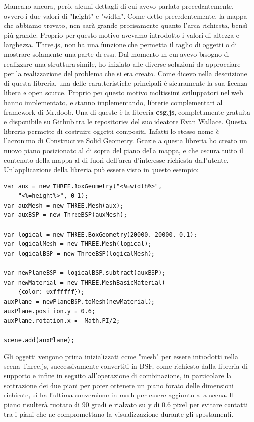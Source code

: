 Mancano ancora, però, alcuni dettagli di cui avevo parlato precedentemente, ovvero i due valori di "height" e "width". Come detto precedentemente, la mappa che abbiamo trovato, non sarà grande precisamente quanto l'area richiesta, bensì più grande. Proprio per questo motivo avevamo introdotto i valori di altezza e larghezza. Three.js, non ha una funzione che permetta il taglio di oggetti o di mostrare solamente una parte di essi. Dal momento in cui avevo bisogno di realizzare una struttura simile, ho iniziato alle diverse soluzioni da approcciare per la realizzazione del problema che si era creato. Come dicevo nella descrizione di questa libreria, una delle caratteristiche principali è sicuramente la sua licenza libera e open source. Proprio per questo motivo moltissimi sviluppatori nel web hanno implementato, e stanno implementando, librerie complementari al framework di Mr.doob. Una di queste è la libreria \textbf{csg.js}, completamente gratuita e disponibile su Github tra le repositories del suo ideatore Evan Wallace\cite{git:csg}. Questa libreria permette di costruire oggetti compositi. Infatti lo stesso nome è l'acronimo di Constructive Solid Geometry. Grazie a questa libreria ho creato un nuovo piano posizionato al di sopra del piano della mappa, e che oscura tutto il contenuto della mappa al di fuori dell'area d'interesse richiesta dall'utente. Un'applicazione della libreria può essere visto in questo esempio:
\begin{verbatim}
var aux = new THREE.BoxGeometry("<%=width%>", 
	"<%=height%>", 0.1);
var auxMesh = new THREE.Mesh(aux);
var auxBSP = new ThreeBSP(auxMesh);

var logical = new THREE.BoxGeometry(20000, 20000, 0.1);
var logicalMesh = new THREE.Mesh(logical);
var logicalBSP = new ThreeBSP(logicalMesh);

var newPlaneBSP = logicalBSP.subtract(auxBSP);
var newMaterial = new THREE.MeshBasicMaterial(
	{color: 0xffffff});
auxPlane = newPlaneBSP.toMesh(newMaterial);
auxPlane.position.y = 0.6;
auxPlane.rotation.x = -Math.PI/2;

scene.add(auxPlane);
\end{verbatim}
Gli oggetti vengono prima inizializzati come "mesh" per essere introdotti nella scena Three.js, successivamente convertiti in BSP, come richiesto dalla libreria di supporto e infine in seguito all'operazione di combinazione, in particolare la sottrazione dei due piani per poter ottenere un piano forato delle dimensioni richieste, si ha l'ultima conversione in mesh per essere aggiunto alla scena. Il piano risulterà ruotato di 90 gradi e rialzato su y di 0.6 pixel per evitare contatti tra i piani che ne compromettano la visualizzazione durante gli spostamenti.

